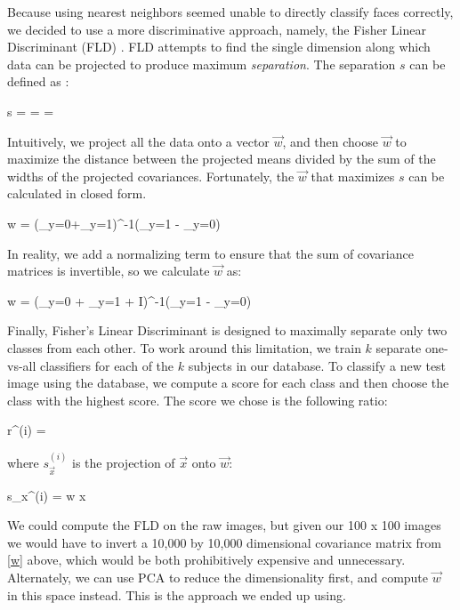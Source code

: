 Because using nearest neighbors seemed unable to directly classify
faces correctly, we decided to use a more discriminative approach,
namely, the Fisher Linear Discriminant (FLD) \cite{wikiFld}.  FLD
attempts to find the single dimension along which data can be
projected to produce maximum \emph{separation}.  The separation $s$
can be defined as \cite{wikiFld}:

\be 
s = =  = 
\ee

\noindent Intuitively, we project all the data onto a vector $\vec w$,
and then choose $\vec w$ to maximize the distance between the
projected means divided by the sum of the widths of the projected
covariances.  Fortunately, the $\vec w$ that maximizes $s$ can be
calculated in closed form.

\be
\vec w = (\Sigma_{y=0}+\Sigma_{y=1})^{-1}(\vec \mu_{y=1} - \vec \mu_{y=0})
\ee

\noindent In reality, we add a normalizing term to ensure that the sum
of covariance matrices is invertible, so we calculate $\vec w$ as:

\be
\vec w = (\Sigma_{y=0} + \Sigma_{y=1} + \epsilon I)^{-1}(\vec \mu_{y=1} - \vec \mu_{y=0})
\ee

Finally, Fisher's Linear Discriminant is designed to maximally
separate only two classes from each other.  To work around this
limitation, we train $k$ separate one-vs-all classifiers for each of
the $k$ subjects in our database.  To classify a new test image using
the database, we compute a score for each class and then choose the
class with the highest score.  The score we chose is the following
ratio:

\be
r^{(i)} = 
\ee


\noindent where $s_{\vec x}^{(i)}$ is the projection of $\vec x$ onto $\vec w$:

\be
s_{\vec x}^{(i)} = \vec w \cdot \vec x
\ee

We could compute the FLD on the raw images, but given our 100 x 100
images we would have to invert a 10,000 by 10,000 dimensional
covariance matrix from \eqref{w} above, which would be both
prohibitively expensive and unnecessary.  Alternately, we can use PCA
to reduce the dimensionality first, and compute $\vec w$ in this space
instead.  This is the approach we ended up using.

